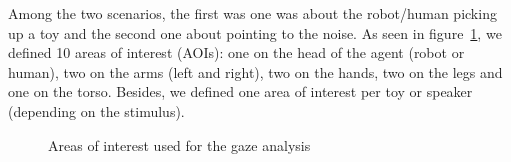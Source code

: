 \documentclass[lettersize, apacite, twoside, HRI]{apa_HRI}
\begin{document}
Among the two scenarios, the first was one was about the robot/human picking up
a toy and the second one about pointing to the noise. As seen in
figure~\ref{fig:aoi}, we defined 10 areas of interest (AOIs): one on the head of
the agent (robot or human), two on the arms (left and right), two on the hands,
two on the legs and one on the torso. Besides, we defined one area of interest
per toy or speaker (depending on the stimulus).

\begin{figure}
    \centering


    \caption{Areas of interest used for the gaze analysis}
    \label{fig:aoi}
\end{figure}
\end{document}
